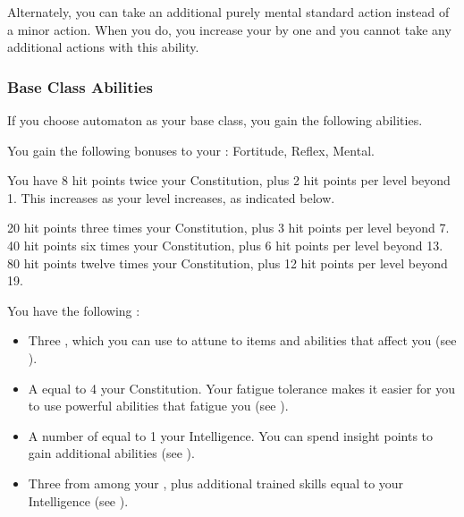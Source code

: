             Alternately, you can take an additional purely mental standard action instead of a minor action.
            When you do, you increase your  by one and you  cannot take any additional actions with this ability.

        \subsubsection{Base Class Abilities}
            If you choose automaton as your base class, you gain the following abilities.

            You gain the following bonuses to your :  Fortitude,  Reflex,  Mental.

                You have 8 hit points \add twice your Constitution, plus 2 hit points per level beyond 1.
                This increases as your level increases, as indicated below.
                \begin{itemize}
                     20 hit points \add three times your Constitution, plus 3 hit points per level beyond 7.
                     40 hit points \add six times your Constitution, plus 6 hit points per level beyond 13.
                     80 hit points \add twelve times your Constitution, plus 12 hit points per level beyond 19.
                \end{itemize}

             You have the following :
            \begin{itemize}
                \item Three , which you can use to attune to items and abilities that affect you (see ).
                \item A  equal to 4 \add your Constitution.
                    Your fatigue tolerance makes it easier for you to use powerful abilities that fatigue you (see ).
                \item A number of  equal to 1 \add your Intelligence.
                    You can spend insight points to gain additional abilities (see ).
                \item Three  from among your , plus additional trained skills equal to your Intelligence (see ).
            \end{itemize}

